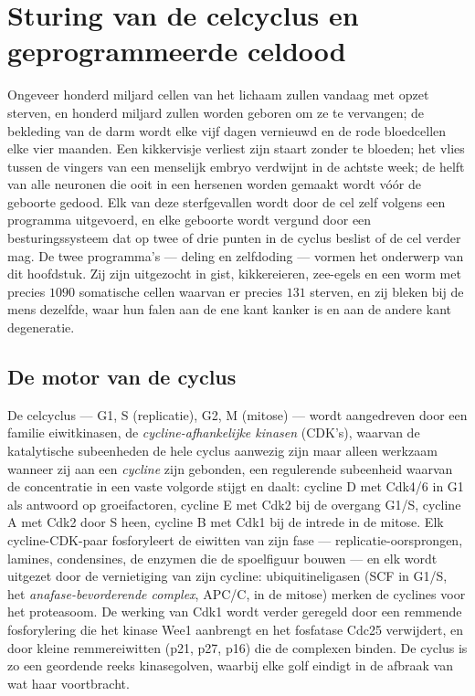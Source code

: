 \chapter{Sturing van de celcyclus en geprogrammeerde celdood}\label{ch:b3:cell-cycle-apoptosis}

Ongeveer honderd miljard cellen van het lichaam zullen vandaag met opzet
sterven, en honderd miljard zullen worden geboren om ze te vervangen;
de bekleding van de darm wordt elke vijf dagen vernieuwd en de rode
bloedcellen elke vier maanden. Een kikkervisje verliest zijn staart
zonder te bloeden; het vlies tussen de vingers van een menselijk embryo
verdwijnt in de achtste week; de helft van alle neuronen die ooit in
een hersenen worden gemaakt wordt vóór de geboorte gedood. Elk van
deze sterfgevallen wordt door de cel zelf volgens een programma
uitgevoerd, en elke geboorte wordt vergund door een besturingssysteem
dat op twee of drie punten in de cyclus beslist of de cel verder mag.
De twee programma's --- deling en zelfdoding --- vormen het onderwerp
van dit hoofdstuk. Zij zijn uitgezocht in gist, kikkereieren,
zee-egels en een worm met precies $1090$ somatische cellen waarvan er
precies $131$ sterven, en zij bleken bij de mens dezelfde, waar hun
falen aan de ene kant kanker is en aan de andere kant degeneratie.

\section{De motor van de cyclus}

\begin{definition}\label{def:b3:cell-cycle-apoptosis:cdk}
De celcyclus --- G1, S (replicatie), G2, M (mitose) --- wordt
aangedreven door een familie eiwitkinasen, de \emph{cycline-afhankelijke
kinasen} (CDK's), waarvan de katalytische subeenheden de hele cyclus
aanwezig zijn maar alleen werkzaam wanneer zij aan een \emph{cycline}
zijn gebonden, een regulerende subeenheid waarvan de concentratie in
een vaste volgorde stijgt en daalt: cycline D met Cdk4/6 in G1 als
antwoord op groeifactoren, cycline E met Cdk2 bij de overgang G1/S,
cycline A met Cdk2 door S heen, cycline B met Cdk1 bij de intrede in de
mitose. Elk cycline-CDK-paar fosforyleert de eiwitten van zijn fase ---
replicatie-oorsprongen, lamines, condensines, de enzymen die de
spoelfiguur bouwen --- en elk wordt uitgezet door de vernietiging van
zijn cycline: ubiquitineligasen (SCF in G1/S, het
\emph{anafase-bevorderende complex}, APC/C, in de mitose) merken de
cyclines voor het proteasoom. De werking van Cdk1 wordt verder geregeld
door een remmende fosforylering die het kinase Wee1 aanbrengt en het
fosfatase Cdc25 verwijdert, en door kleine remmereiwitten (p21, p27,
p16) die de complexen binden. De cyclus is zo een geordende reeks
kinasegolven, waarbij elke golf eindigt in de afbraak van wat haar
voortbracht.
\end{definition}

